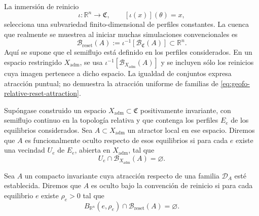 La inmersión de reinicio
\begin{equation}
 \iota:\mathbb R^n\longrightarrow\mathfrak C,
 \qquad [\iota(x)](\theta)=x,
 \label{eq:geofo-reset-embedding}
\end{equation}
selecciona una subvariedad finito-dimensional de perfiles constantes. La
cuenca que realmente se muestrea al iniciar muchas simulaciones convencionales
es
\begin{equation}
 \mathcal B_{\mathrm{reset}}(A)
 :=\iota^{-1}\!\left[\mathcal B_{\mathfrak C}(A)\right]
 \subset\mathbb R^n.
 \label{eq:geofo-reset-basin}
\end{equation}
Aquí se supone que el semiflujo está definido en los perfiles considerados.
En un espacio restringido \(X_{\mathrm{adm}}\), se usa
\(\iota^{-1}[\mathcal B_{X_{\mathrm{adm}}}(A)]\) y se incluyen sólo los
reinicios cuya imagen pertenece a dicho espacio. La igualdad de conjuntos
expresa atracción puntual; no demuestra la atracción uniforme de familias
de \cref{eq:geofo-relative-reset-attraction}.

\begin{definition}
Supóngase construido un espacio \(X_{\mathrm{adm}}\subset\mathfrak C\)
positivamente invariante, con semiflujo continuo en la topología relativa y
que contenga los perfiles \(E_e\) de los equilibrios considerados.
Sea \(A\subset X_{\mathrm{adm}}\) un atractor local en ese espacio.
Diremos que \(A\) es funcionalmente oculto respecto de esos equilibrios si
para cada \(e\) existe una vecindad \(U_e\) de \(E_e\), abierta en
\(X_{\mathrm{adm}}\), tal que
\begin{equation}
 U_e\cap\mathcal B_{X_{\mathrm{adm}}}(A)=\varnothing.
 \label{eq:geofo-functional-hiddenness}
\end{equation}
\end{definition}

\begin{definition}
Sea \(A\) un compacto invariante cuya atracción respecto de una familia
\(\mathcal D_A\) esté establecida. Diremos que \(A\) es oculto bajo la
convención de reinicio si para cada
equilibrio \(e\) existe \(\rho_e>0\) tal que
\begin{equation}
 B_{\mathbb R^n}(e,\rho_e)
 \cap\mathcal B_{\mathrm{reset}}(A)=\varnothing.
 \label{eq:geofo-reset-hiddenness}
\end{equation}
\end{definition}

